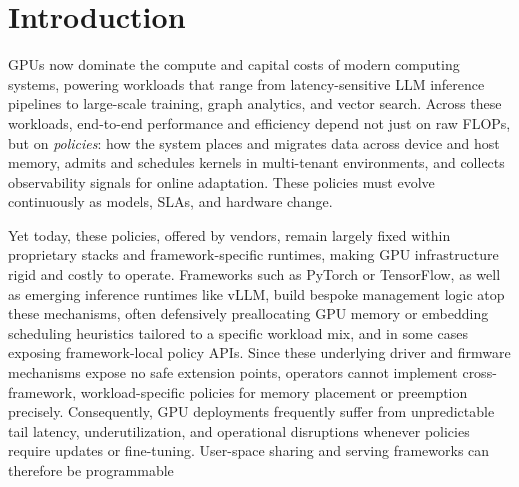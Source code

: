 \section{Introduction}

GPUs now dominate the compute and capital costs of modern computing systems, powering workloads that range from latency-sensitive LLM inference pipelines to large-scale training, graph analytics, and vector search. Across these workloads, end-to-end performance and efficiency depend not just on raw FLOPs, but on \emph{policies}: how the system places and migrates data across device and host memory, admits and schedules kernels in multi-tenant environments, and collects observability signals for online adaptation. These policies must evolve continuously as models, SLAs, and hardware change. 

Yet today, these policies, offered by vendors, remain largely fixed within proprietary stacks and framework-specific runtimes, making GPU infrastructure rigid and costly to operate. 
Frameworks such as PyTorch or TensorFlow, as well as emerging inference runtimes like vLLM, build bespoke management logic atop these mechanisms, often defensively preallocating GPU memory or embedding scheduling heuristics tailored to a specific workload mix, and in some cases exposing framework-local policy APIs. 
Since these underlying driver and firmware mechanisms expose no safe extension points, operators cannot implement cross-framework, workload-specific policies for memory placement or preemption precisely.
Consequently, GPU deployments frequently suffer from unpredictable tail latency, underutilization, and operational disruptions whenever policies require updates or fine-tuning. 
User-space sharing and serving frameworks can therefore be programmable 

